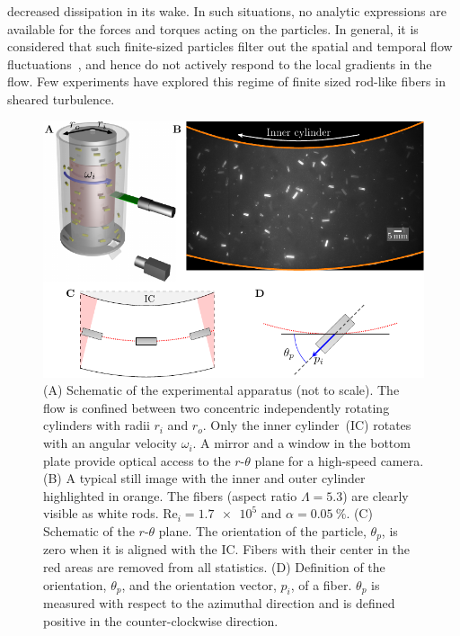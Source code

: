 decreased dissipation in its wake.  In such situations, no analytic
expressions are available for the forces and torques acting on the particles.
In general, it is considered that such finite-sized particles  filter out the
spatial and temporal flow fluctuations~\cite{Toschi2009, Calzavarini2009,
Bec2010, Bellani2012, Bellani2012b, Mathai2015, Almeras2017, Bakhuis2018,
Mathai2018}, and hence do not actively respond to the local gradients in the
flow. Few experiments have explored this regime of finite sized rod-like
fibers in sheared turbulence.\\
%
\begin{figure}[htp] %
\centering
\includegraphics{figure1setupfiber.pdf}
\caption{(A) Schematic of the experimental apparatus (not to scale). The flow
is confined between two concentric independently rotating cylinders with radii
$r_i$ and $r_o$. Only the inner cylinder~(IC) rotates with an angular velocity
$\omega_i$. A mirror and a window in the bottom plate provide optical access
to the $r$-$\theta$ plane for a high-speed camera. (B) A typical still image
with the inner and outer cylinder highlighted in orange. The fibers (aspect
ratio $\Lambda =5.3$) are clearly visible as white rods. $\text{Re}_i =
\num{1.7e5}$ and $\alpha = \SI{0.05}{\percent}$. (C) Schematic of the
$r$-$\theta$ plane. The orientation of the particle, $\theta_p$, is zero when
it is aligned with the IC. Fibers with their center in the red areas are
removed from all statistics. (D) Definition of the orientation, $\theta_p$,
and the orientation vector, $p_i$, of a fiber. $\theta_p$ is measured with
respect to the azimuthal direction and is defined positive in the
counter-clockwise direction.}
\label{fig:setupfib}
\end{figure}
 
